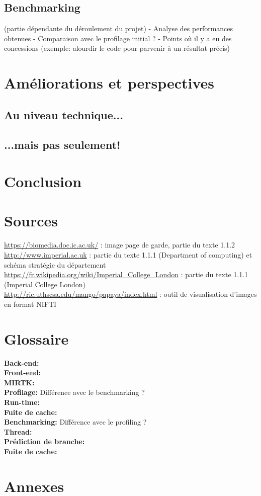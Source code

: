 \documentclass[10pt]{report}
\begin{document}
	\section{Benchmarking}
	(partie dépendante du déroulement du projet)\newline
	- Analyse des performances obtenues \newline
	- Comparaison avec le profilage initial ? \newline
	- Points où il y a eu des concessions (exemple: alourdir le code pour parvenir à un résultat précis)
	
\chapter{Améliorations et perspectives}
	\section{Au niveau technique...}
	\section{...mais pas seulement!}

\chapter*{Conclusion} %
\chapter*{Sources}
\noindent
\url{https://biomedia.doc.ic.ac.uk/}  : image page de garde, partie du texte 1.1.2 \\
\url{http://www.imperial.ac.uk} : partie du texte 1.1.1 (Department of computing) et schéma stratégie du département\\
\url{https://fr.wikipedia.org/wiki/Imperial_College_London} : partie du texte 1.1.1 (Imperial College London)\\
\url{http://ric.uthscsa.edu/mango/papaya/index.html} : outil de visualisation d'images en format NIFTI
\renewcommand{\listfigurename}{Table des illustations}
\listoffigures
{}
\chapter*{Glossaire}
\noindent
\textbf{Back-end:}\\ 
\textbf{Front-end:}\\
\textbf{MIRTK:}\\
\textbf{Profilage:} Différence avec le benchmarking ?\\
\textbf{Run-time:}\\
\textbf{Fuite de cache:}\\
\textbf{Benchmarking:} Différence avec le profiling ?\\
\textbf{Thread:}\\
\textbf{Prédiction de branche:}\\
\textbf{Fuite de cache:}\\


\chapter*{Annexes}
\end{document}
